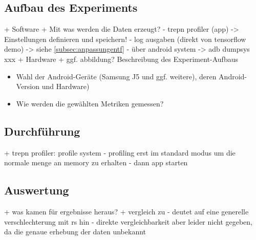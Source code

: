 \subsection{Aufbau des Experiments}
\label{subsec:aufbauexperiment}
+ Software
	+ Mit was werden die Daten erzeugt?
		- trepn profiler (app) -> Einstellungen definieren und speichern!
		- log ausgaben (direkt von tensorflow demo) -> siehe \ref{subsec:anpassungentf}
		- über android system -> adb dumpsys xxx
+ Hardware
	+ ggf. abbildung?
Beschreibung des Experiment-Aufbaus
\begin{itemize}
	\item{Wahl der Android-Geräte (Samsung J5 und ggf. weitere), deren Android-Version und Hardware)}
	\item{Wie werden die gewählten Metriken gemessen?}
\end{itemize}
		

\subsection{Durchführung}
\label{subsec:experimentdurchfuehrung}
+ trepn profiler: profile system
	- profiling erst im standard modus um die normale menge an memory zu erhalten
	- dann app starten

\subsection{Auswertung}
\label{subsec:experimentauswertung}
+ was kamen für ergebnisse heraus?
+ vergleich zu \cite{rstensorflow2017}
	- deutet auf eine generelle verschlechterung mit rs hin
	- direkte vergleichbarkeit aber leider nicht gegeben, da die genaue erhebung der daten unbekannt
